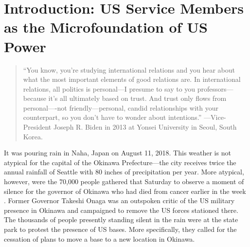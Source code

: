 \chapter{Introduction: US Service Members as the Microfoundation of US Power \label{cha:intro}}

\setcounter{page}{1}


\begin{quote}
	``You know, you’re studying international relations and you hear about what the most important elements of good relations are.  In international relations, all politics is personal---I presume to say to you professors---because it’s all ultimately based on trust.  And trust only flows from personal----not friendly---personal, candid relationships with your counterpart, so you don’t have to wonder about intentions.'' ---Vice-President Joseph R. Biden in 2013 at Yonsei University in Seoul, South Korea.
\end{quote}



\doublespacing


\noindent It was pouring rain in Naha, Japan on August 11, 2018. This weather is not atypical for the capital of the Okinawa Prefecture---the city receives twice the annual rainfall of Seattle with 80 inches of precipitation per year. More atypical, however, were the 70,000 people gathered that Saturday to observe a moment of silence for the governor of Okinawa who had died from cancer earlier in the week \cite{cnbc2018,tjt2018}. Former Governor Takeshi Onaga was an outspoken critic of the US military presence in Okinawa and campaigned to remove the US forces stationed there. The thousands of people presently standing silent in the rain were at the state park to protest the presence of US bases. More specifically, they called for the cessation of plans to move a base to a new location in Okinawa. 

